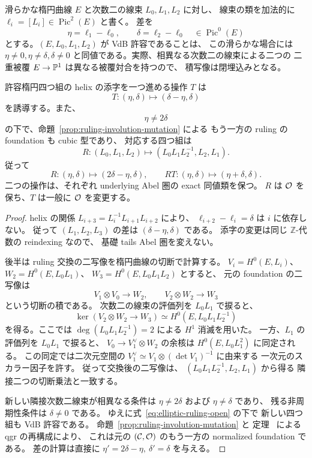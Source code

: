 滑らかな楕円曲線 $E$ と次数二の線束 $L_0,L_1,L_2$ に対し、
線束の類を加法的に $\ell_i=[L_i]\in\operatorname{Pic}^2(E)$ と書く。
差を
\[
 \eta=\ell_1-\ell_0,\qquad \delta=\ell_2-\ell_0
 \quad\in\operatorname{Pic}^0(E)
\]
とする。$(E,L_0,L_1,L_2)$ が VdB 許容であることは、
この滑らかな場合には $\eta\ne0,\eta\ne\delta,\delta\ne0$
と同値である。実際、相異なる次数二の線束による二つの
二重被覆 $E\to\mathbb P^1$ は異なる被覆対合を持つので、
積写像は閉埋込みとなる。

\begin{lemma}[楕円四つ組の二つの反射]
\label{lem:elliptic-two-reflections}
許容楕円四つ組の helix の添字を一つ進める操作 $T$ は
\[
 T:(\eta,\delta)\longmapsto(\delta-\eta,\delta)
\]
を誘導する。また、
\[
 \eta\ne2\delta
 \tag{R-open}\label{eq:elliptic-ruling-open}
\]
の下で、命題~\ref{prop:ruling-involution-mutation} による
もう一方の ruling の foundation も cubic 型であり、
対応する四つ組は
\[
 R:(L_0,L_1,L_2)\longmapsto
 (L_0L_1L_2^{-1},L_2,L_1).
\]
従って
\[
 R:(\eta,\delta)\longmapsto(2\delta-\eta,\delta),
 \qquad RT:(\eta,\delta)\longmapsto(\eta+\delta,\delta).
\]
二つの操作は、それぞれ underlying Abel 圏の exact 同値類を保つ。
$R$ は $\mathcal O$ を保ち、$T$ は一般に $\mathcal O$ を変更する。
\end{lemma}
\begin{proof}
helix の関係
$L_{i+3}=L_i^{-1}L_{i+1}L_{i+2}$ により、
$\ell_{i+2}-\ell_i=\delta$ は $i$ に依存しない。
従って $(L_1,L_2,L_3)$ の差は
$(\delta-\eta,\delta)$ である。
添字の変更は同じ $\mathbb Z$-代数の reindexing なので、
基礎 tails Abel 圏を変えない。

後半は ruling 交換の二写像を楕円曲線の切断で計算する。
$V_i=H^0(E,L_i)$、$W_2=H^0(E,L_0L_1)$、
$W_3=H^0(E,L_0L_1L_2)$ とすると、
元の foundation の二写像は
\[
 V_1\otimes V_0\longrightarrow W_2,\qquad
 V_2\otimes W_2\longrightarrow W_3
\]
という切断の積である。
次数二の線束の評価列を $L_0L_1$ で捩ると、
\[
 \ker(V_2\otimes W_2\longrightarrow W_3)
 \simeq H^0(E,L_0L_1L_2^{-1})
\]
を得る。ここでは $\deg(L_0L_1L_2^{-1})=2$ による
$H^1$ 消滅を用いた。
一方、$L_1$ の評価列を $L_0L_1$ で捩ると、
$V_0\to V_1^\vee\otimes W_2$ の余核は
$H^0(E,L_0L_1^2)$ に同定される。
この同定では二次元空間の
$V_1^\vee\simeq V_1\otimes(\det V_1)^{-1}$ に由来する
一次元のスカラー因子を許す。
従って交換後の二写像は、
$(L_0L_1L_2^{-1},L_2,L_1)$ から得る
隣接二つの切断乗法と一致する。

新しい隣接次数二線束が相異なる条件は
$\eta\ne2\delta$ および $\eta\ne\delta$ であり、
残る非周期性条件は $\delta\ne0$ である。
ゆえに式~\eqref{eq:elliptic-ruling-open} の下で
新しい四つ組も VdB 許容である。
命題~\ref{prop:ruling-involution-mutation} と
定理~\cite[\texttt{thm:normal-helix}]{QuadricIntrinsic2026} による qgr の再構成により、
これは元の $(\mathcal C,\mathcal O)$ のもう一方の normalized foundation である。
差の計算は直接に
$\eta'=2\delta-\eta,\ \delta'=\delta$ を与える。
\end{proof}

